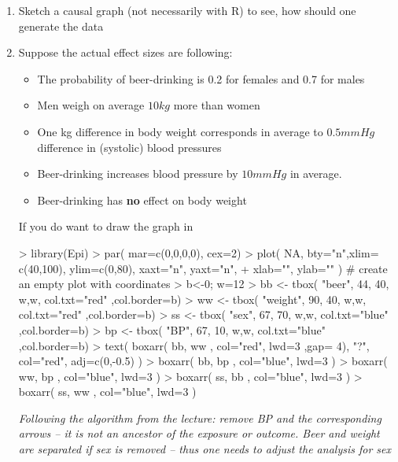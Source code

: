 \begin{enumerate}
\item Sketch a causal graph (not necessarily with R) to see, how should one generate the data
\item Suppose the actual effect sizes are following:
\begin{itemize}
\item The probability of beer-drinking is 0.2 for females and 0.7 for males
\item Men weigh on average $10kg$ more than women
\item One kg difference in body weight corresponds in
average to $0.5mmHg$ difference in (systolic) blood pressures
\item Beer-drinking increases blood pressure by $10mmHg$ in average.
\item Beer-drinking has \textbf{no} effect on body weight
\end{itemize}

If you do want to draw the graph in \R\:
\begin{Schunk}
\begin{Sinput}
> library(Epi)
> par( mar=c(0,0,0,0), cex=2)
> plot( NA, bty="n",xlim= c(40,100), ylim=c(0,80), xaxt="n", yaxt="n",
+  xlab="", ylab="" ) # create an empty plot with coordinates
> b<-0; w=12
> bb  <- tbox( "beer", 44, 40, w,w, col.txt="red" ,col.border=b)
> ww  <- tbox( "weight", 90, 40, w,w, col.txt="red" ,col.border=b)
> ss  <- tbox( "sex", 67, 70, w,w, col.txt="blue" ,col.border=b)
> bp  <- tbox( "BP", 67, 10, w,w, col.txt="blue" ,col.border=b)
> text( boxarr( bb, ww , col="red", lwd=3 ,gap= 4), "?", col="red", adj=c(0,-0.5) )
> boxarr( bb, bp , col="blue", lwd=3 )
> boxarr( ww, bp , col="blue", lwd=3 )
> boxarr( ss, bb , col="blue", lwd=3 )
> boxarr( ss, ww , col="blue", lwd=3 )
\end{Sinput}
\end{Schunk}

\textit{Following the algorithm from the lecture: remove BP and the corresponding arrows -- it is not an ancestor of the exposure or outcome. Beer and weight are separated if sex is removed -- thus one needs to adjust the analysis for sex}



\end{enumerate}
